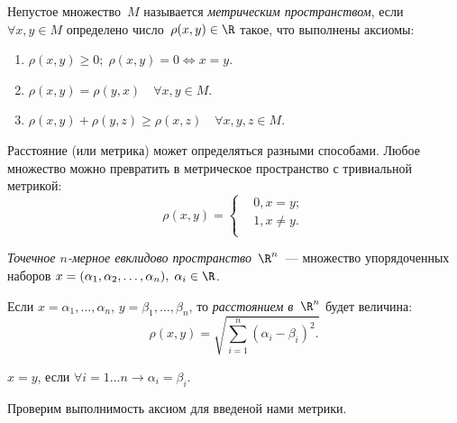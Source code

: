 \setcounter{section}{8}

\begin{definition}
Непустое множество~\(M\) называется \textit{метрическим пространством}, если
\(\forall x, y \in M\) определено число~\(\rho(x, y) \in \R\) такое, что
выполнены аксиомы:
\begin{enumerate}
\item \(\rho(x, y) \geq 0; \; \rho(x, y) = 0 \Longleftrightarrow x = y\).
\item \(\rho(x, y) = \rho(y, x) \quad \forall x, y \in M\).
\item \(\rho(x, y) + \rho(y, z) \geq \rho(x, z) \quad \forall x, y, z \in M\).
\end{enumerate}
\end{definition}

\begin{note}
Расстояние (или метрика) может определяться разными способами. Любое множество
можно превратить в метрическое пространство с тривиальной метрикой:
\[
    \rho(x, y) = \left\{
        \begin{aligned}
            & 0, x = y;\\
            & 1, x \neq y.\\
        \end{aligned}
    \right .\]
\end{note}

\begin{definition}
\textit{Точечное \(n\)-мерное евклидово пространство~\(\R^n\)}~--- множество
упорядоченных наборов \(x = (\alpha_1, \alpha_2, \dots, \alpha_n), \; \alpha_i
\in \R\).
\end{definition}

\begin{definition}
Если \(x = \alpha_1, \dots, \alpha_n\), \(y = \beta_1, \dots, \beta_n\), то
\textit{расстоянием в~\(\R^n\)} будет величина:
\[
    \rho(x, y) = \sqrt{\sum_{i=1}^n (\alpha_i - \beta_i)^2.}
\]
\end{definition}

\begin{definition}
\(x = y\), если \(\forall i = 1 \dots n \rightarrow \alpha_i = \beta_i\).
\end{definition}

Проверим выполнимость аксиом для введеной нами метрики.

